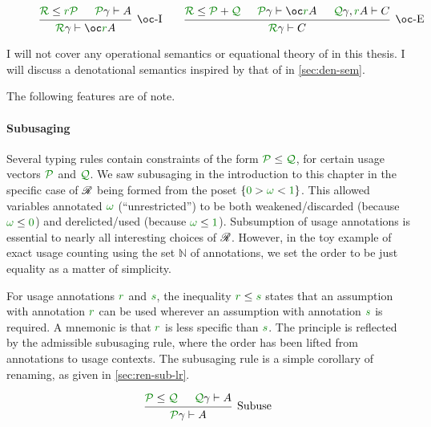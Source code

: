 \begin{figure}
\begin{displaymath}
\begin{matrix}
\begin{prooftree}
        \hypo{\grR \le \gr r\grP}
        \hypo{\grP\gamma \vdash A}
        \infer2[$\oc$-I]{\grR\gamma \vdash \oc\gr rA}
      \end{prooftree}
      &&
      \begin{prooftree}
        \hypo{\grR \le \grP + \grQ}
        \hypo{\grP\gamma \vdash \oc\gr rA}
        \hypo{\grQ\gamma, \gr rA \vdash C}
        \infer3[$\oc$-E]{\grR\gamma \vdash C}
      \end{prooftree}
    \end{matrix}
  \end{displaymath}
  \caption{\name{}}
  \label{fig:lr}
\end{figure}

I will not cover any operational semantics or equational theory of \name{} in
this thesis.
I will discuss a denotational semantics inspired by that of
\citet{AbelBernardy2020} in \cref{sec:den-sem}.

The following features are of note.

\paragraph{Subusaging}
Several typing rules contain constraints of the form $\grP \leq \grQ$, for
certain usage vectors $\grP$ and $\grQ$.
We saw subusaging in the introduction to this chapter in the specific case of
$\mathscr R$ being formed from the poset $\{\gr0 > \gr\omega < \gr1\}$.
This allowed variables annotated $\gr\omega$ (``unrestricted'') to be both
weakened/discarded (because $\gr\omega \leq \gr0$) and derelicted/used
(because $\gr\omega \leq \gr1$).
Subsumption of usage annotations is essential to nearly all interesting choices
of $\mathscr R$.
However, in the toy example of exact usage counting using the set $\mathbb N$ of
annotations, we set the order to be just equality as a matter of simplicity.

For usage annotations $\gr r$ and $\gr s$, the inequality $\gr r \leq \gr s$
states that an assumption with annotation $\gr r$ can be used wherever an
assumption with annotation $\gr s$ is required.
A mnemonic is that $\gr r$ is less specific than $\gr s$.
The principle is reflected by the admissible subusaging rule, where the order
has been lifted from annotations to usage contexts.
The subusaging rule is a simple corollary of renaming, as given in
\cref{sec:ren-sub-lr}.

\[
  \begin{prooftree}
    \hypo{\grP \leq \grQ}
    \hypo{\grQ\gamma \vdash A}
    \infer2[Subuse]{\grP\gamma \vdash A}
  \end{prooftree}
\]

